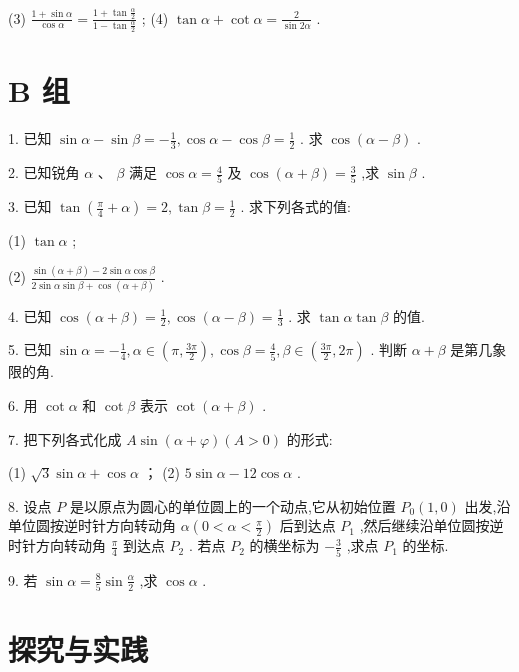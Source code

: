 \documentclass[10pt]{article}
\begin{document}
(3) \(\frac{1 + \sin \alpha }{\cos \alpha } = \frac{1 + \tan \frac{\alpha }{2}}{1 - \tan \frac{\alpha }{2}}\) ; (4) \(\tan \alpha  + \cot \alpha  = \frac{2}{\sin {2\alpha }}\) .

\section*{B 组}

1. 已知 \(\sin \alpha  - \sin \beta  =  - \frac{1}{3},\cos \alpha  - \cos \beta  = \frac{1}{2}\) . 求 \(\cos \left( {\alpha  - \beta }\right)\) .

2. 已知锐角 \(\alpha \text{ 、 }\beta\) 满足 \(\cos \alpha  = \frac{4}{5}\) 及 \(\cos \left( {\alpha  + \beta }\right)  = \frac{3}{5}\) ,求 \(\sin \beta\) .

3. 已知 \(\tan \left( {\frac{\pi }{4} + \alpha }\right)  = 2,\tan \beta  = \frac{1}{2}\) . 求下列各式的值:

(1) \(\tan \alpha\) ;

(2) \(\frac{\sin \left( {\alpha  + \beta }\right)  - 2\sin \alpha \cos \beta }{2\sin \alpha \sin \beta  + \cos \left( {\alpha  + \beta }\right) }\) .

4. 已知 \(\cos \left( {\alpha  + \beta }\right)  = \frac{1}{2},\cos \left( {\alpha  - \beta }\right)  = \frac{1}{3}\) . 求 \(\tan \alpha \tan \beta\) 的值.

5. 已知 \(\sin \alpha  =  - \frac{1}{4},\alpha  \in  \left( {\pi ,\frac{3\pi }{2}}\right) ,\cos \beta  = \frac{4}{5},\beta  \in  \left( {\frac{3\pi }{2},{2\pi }}\right)\) . 判断 \(\alpha  + \beta\) 是第几象限的角.

6. 用 \(\cot \alpha\) 和 \(\cot \beta\) 表示 \(\cot \left( {\alpha  + \beta }\right)\) .

7. 把下列各式化成 \(A\sin \left( {\alpha  + \varphi }\right) \left( {A > 0}\right)\) 的形式:

(1) \(\sqrt{3}\sin \alpha  + \cos \alpha\) ； (2) \(5\sin \alpha  - {12}\cos \alpha\) .

8. 设点 \(P\) 是以原点为圆心的单位圆上的一个动点,它从初始位置 \({P}_{0}\left( {1,0}\right)\) 出发,沿单位圆按逆时针方向转动角 \(\alpha \left( {0 < \alpha  < \frac{\pi }{2}}\right)\) 后到达点 \({P}_{1}\) ,然后继续沿单位圆按逆时针方向转动角 \(\frac{\pi }{4}\) 到达点 \({P}_{2}\) . 若点 \({P}_{2}\) 的横坐标为 \(- \frac{3}{5}\) ,求点 \({P}_{1}\) 的坐标.

9. 若 \(\sin \alpha  = \frac{8}{5}\sin \frac{\alpha }{2}\) ,求 \(\cos \alpha\) .

\section*{探究与实践}
\end{document}
